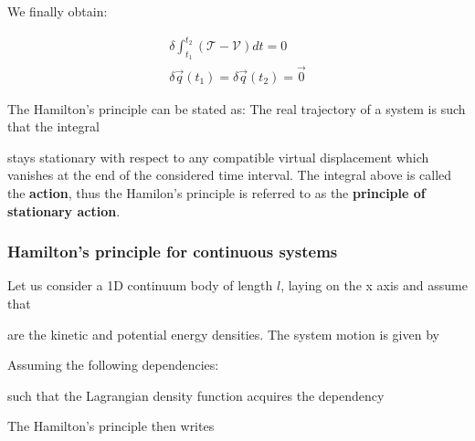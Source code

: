 \documentclass[10pt,a4paper]{scrartcl}
\begin{document}
\begin{multicols*}{2}

We finally obtain:

\begin{align*}
\delta\int_{t_1}^{t_2}\left(\mathcal{T}-\mathcal{V}\right)dt=0\\
\delta\vec{q}(t_1)=\delta\vec{q}(t_2)=\vec{0}
\end{align*}

The Hamilton's principle can be stated as: The real trajectory of a system is such that the integral


stays stationary with respect to any compatible virtual displacement which vanishes at the end of the considered time interval. The integral above is called the \textbf{action}, thus the Hamilon's principle is referred to as the \textbf{principle of stationary action}.

\subsubsection{Hamilton's principle for continuous systems}

Let us consider a 1D continuum body of length $l$, laying on the x axis and assume that


are the kinetic and potential energy densities. The system motion is given by 


Assuming the following dependencies:


such that the Lagrangian density function acquires the dependency


The Hamilton's principle then writes 



\end{multicols*}
\end{document}
